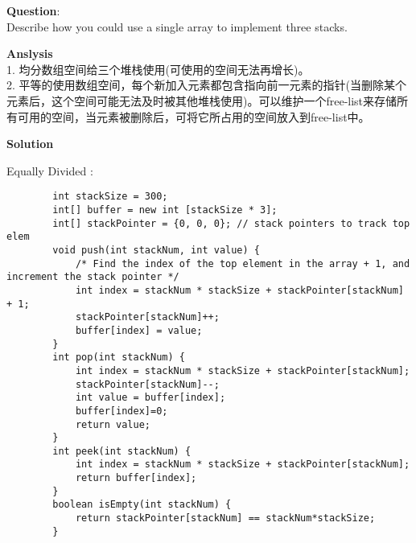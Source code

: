     
\begin{description}
    \item{\textbf{Question}}:\\%
		Describe how you could use a single array to implement three stacks.

    \item{\textbf{Anslysis}}\\
		1. 均分数组空间给三个堆栈使用(可使用的空间无法再增长)。\\
		2. 平等的使用数组空间，每个新加入元素都包含指向前一元素的指针(当删除某个元素后，这个空间可能无法及时被其他堆栈使用)。可以维护一个free-list来存储所有可用的空间，当元素被删除后，可将它所占用的空间放入到free-list中。

    \item{\textbf{Solution}}\\
	\item{Equally Divided} : \\
		\begin{lstlisting}
		int stackSize = 300;
		int[] buffer = new int [stackSize * 3];
		int[] stackPointer = {0, 0, 0}; // stack pointers to track top elem
		void push(int stackNum, int value) {
			/* Find the index of the top element in the array + 1, and increment the stack pointer */
			int index = stackNum * stackSize + stackPointer[stackNum] + 1;
			stackPointer[stackNum]++;
			buffer[index] = value;	
		}
		int pop(int stackNum) {
			int index = stackNum * stackSize + stackPointer[stackNum];
			stackPointer[stackNum]--;
			int value = buffer[index];
			buffer[index]=0;
			return value;
		}
		int peek(int stackNum) {
			int index = stackNum * stackSize + stackPointer[stackNum];
			return buffer[index];
		}
		boolean isEmpty(int stackNum) {
			return stackPointer[stackNum] == stackNum*stackSize;
		}
		\end{lstlisting}
\end{description}

